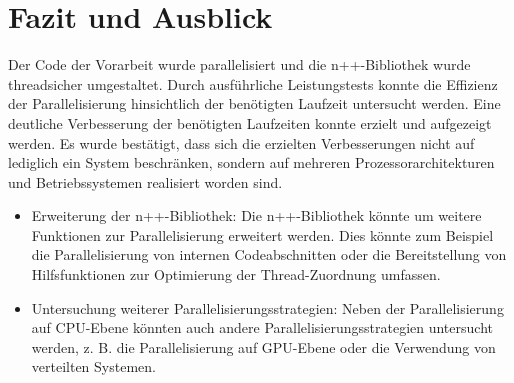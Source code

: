 \chapter{Fazit und Ausblick}
\label{ch:Zusammenfassung}

Der Code der Vorarbeit wurde parallelisiert und die n++-Bibliothek wurde threadsicher umgestaltet. Durch ausführliche Leistungstests konnte die Effizienz der Parallelisierung hinsichtlich der benötigten Laufzeit untersucht werden. Eine deutliche Verbesserung der benötigten Laufzeiten konnte erzielt und aufgezeigt werden. Es wurde bestätigt, dass sich die erzielten Verbesserungen nicht auf lediglich ein System beschränken, sondern auf mehreren Prozessorarchitekturen und Betriebssystemen realisiert worden sind.

\begin{itemize}
    \item Erweiterung der n++-Bibliothek: Die n++-Bibliothek könnte um weitere Funktionen zur Parallelisierung erweitert werden. Dies könnte zum Beispiel die Parallelisierung von internen Codeabschnitten oder die Bereitstellung von Hilfsfunktionen zur Optimierung der Thread-Zuordnung umfassen.
    \item Untersuchung weiterer Parallelisierungsstrategien: Neben der Parallelisierung auf CPU-Ebene könnten auch andere Parallelisierungsstrategien untersucht werden, z. B. die Parallelisierung auf GPU-Ebene oder die Verwendung von verteilten Systemen.
\end{itemize}